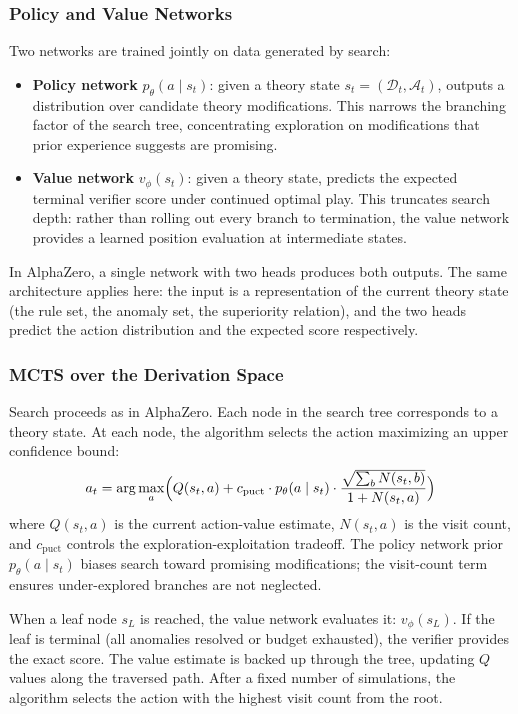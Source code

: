 \documentclass[11pt]{article}
\newcommand{\D}{\mathcal{D}}
\begin{document}
\subsubsection{Policy and Value Networks}

Two networks are trained jointly on data generated by search:

\begin{itemize}[nosep]
    \item \textbf{Policy network} $p_\theta(a \mid s_t)$: given a theory state $s_t = (\D_t, \mathcal{A}_t)$, outputs a distribution over candidate theory modifications. This narrows the branching factor of the search tree, concentrating exploration on modifications that prior experience suggests are promising.
    \item \textbf{Value network} $v_\phi(s_t)$: given a theory state, predicts the expected terminal verifier score under continued optimal play. This truncates search depth: rather than rolling out every branch to termination, the value network provides a learned position evaluation at intermediate states.
\end{itemize}

In AlphaZero, a single network with two heads produces both outputs. The same architecture applies here: the input is a representation of the current theory state (the rule set, the anomaly set, the superiority relation), and the two heads predict the action distribution and the expected score respectively.

\subsubsection{MCTS over the Derivation Space}

Search proceeds as in AlphaZero. Each node in the search tree corresponds to a theory state. At each node, the algorithm selects the action maximizing an upper confidence bound:
\[
    a_t = \arg\max_a \Bigl( Q(s_t, a) + c_{\mathrm{puct}} \cdot p_\theta(a \mid s_t) \cdot \frac{\sqrt{\sum_b N(s_t, b)}}{1 + N(s_t, a)} \Bigr)
\]
where $Q(s_t, a)$ is the current action-value estimate, $N(s_t, a)$ is the visit count, and $c_{\mathrm{puct}}$ controls the exploration-exploitation tradeoff. The policy network prior $p_\theta(a \mid s_t)$ biases search toward promising modifications; the visit-count term ensures under-explored branches are not neglected.

When a leaf node $s_L$ is reached, the value network evaluates it: $v_\phi(s_L)$. If the leaf is terminal (all anomalies resolved or budget exhausted), the verifier provides the exact score. The value estimate is backed up through the tree, updating $Q$ values along the traversed path. After a fixed number of simulations, the algorithm selects the action with the highest visit count from the root.
\end{document}
